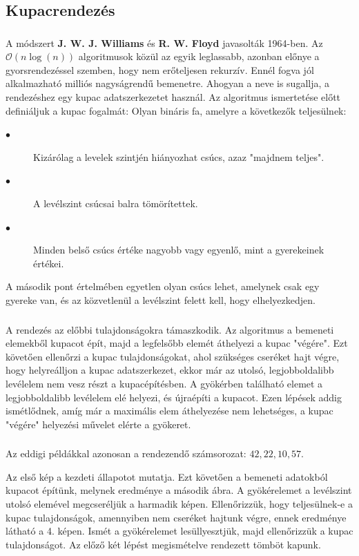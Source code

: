 \documentclass{elteikthesis}
\newcommand{\hiddensubsubsection}[1]{
	\stepcounter{subsubsection}
	\subsubsection*{\hspace{1em}{#1}}
}
\begin{document}
\subsection{Kupacrendezés}
\hiddensubsubsection{Leírás}
A módszert \textbf{J. W. J. Williams} és \textbf{R. W. Floyd} javasolták 1964-ben\cite{Ronyai}.
Az $\mathcal{O}(n\log (n))$ algoritmusok közül az egyik leglassabb, azonban előnye a gyorsrendezéssel szemben, hogy nem erőteljesen rekurzív. Ennél fogva jól alkalmazható milliós nagyságrendű bemenetre. Ahogyan a neve is sugallja, a rendezéshez egy kupac adatszerkezetet használ. Az algoritmus ismertetése előtt definiáljuk a kupac fogalmát\cite{Fekete}:
Olyan bináris fa, amelyre a következők teljesülnek:
\begin{description}
	\item[$\bullet$] Kizárólag a levelek szintjén hiányozhat csúcs, azaz "majdnem teljes".
	\item[$\bullet$] A levélszint csúcsai balra tömörítettek.
	\item[$\bullet$] Minden belső csúcs értéke nagyobb vagy egyenlő, mint a gyerekeinek értékei.
\end{description}
A második pont értelmében egyetlen olyan csúcs lehet, amelynek csak egy gyereke van, és az közvetlenül a levélszint felett kell, hogy elhelyezkedjen.\par
\hiddensubsubsection{Működés}
A rendezés az előbbi tulajdonságokra támaszkodik. 
Az algoritmus a bemeneti elemekből kupacot épít, majd a legfelsőbb elemét áthelyezi a kupac "végére". Ezt követően ellenőrzi a kupac tulajdonságokat, ahol szükséges cseréket hajt végre, hogy helyreálljon a kupac adatszerkezet, ekkor már az utolsó, legjobboldalibb levélelem nem vesz részt a kupacépítésben. A gyökérben található elemet a legjobboldalibb levélelem elé helyezi, és újraépíti a kupacot. Ezen lépések addig ismétlődnek, amíg már a maximális elem áthelyezése nem lehetséges, a kupac "végére" helyezési művelet elérte a gyökeret.\par
 \hiddensubsubsection{Példa}
 Az eddigi példákkal azonosan a rendezendő számsorozat: $42, 22, 10, 57$.\par
 Az első kép a kezdeti állapotot mutatja. Ezt követően a bemeneti adatokból kupacot építünk, melynek eredménye a második ábra. A gyökérelemet a levélszint utolsó elemével megcseréljük a harmadik képen. Ellenőrizzük, hogy teljesülnek-e a kupac tulajdonságok, amennyiben nem cseréket hajtunk végre, ennek eredménye látható a 4. képen. Ismét a gyökérelemet lesüllyesztjük, majd ellenőrizzük a kupac tulajdonságot. Az előző két lépést megismételve rendezett tömböt kapunk.\par
\end{document}
